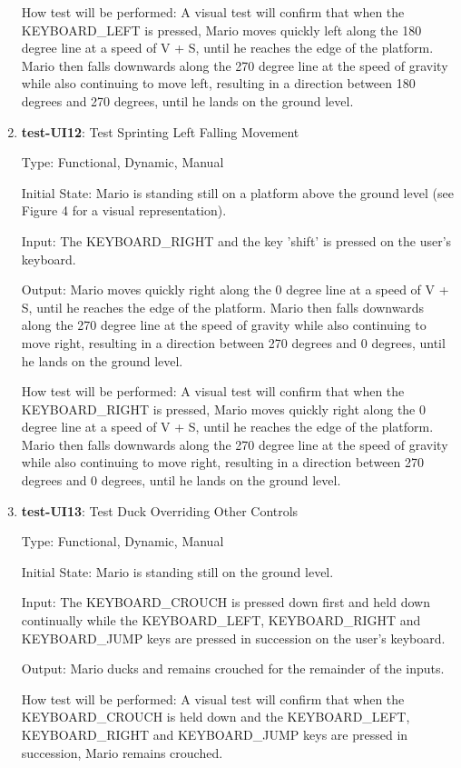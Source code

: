 \documentclass[12pt, titlepage]{article}
\begin{document}
\begin{enumerate}
How test will be performed: A visual test will confirm that when the KEYBOARD\_LEFT is pressed, Mario moves quickly left along the 180 degree line at a speed of V + S, until he reaches the edge of the platform. Mario then falls downwards along the 270 degree line at the speed of gravity while also continuing to move left, resulting in a direction between 180 degrees and 270 degrees, until he lands on the ground level.

\item{\textbf{test-UI12}: Test Sprinting Left Falling Movement\\}

Type: Functional, Dynamic, Manual
					
Initial State: Mario is standing still on a platform above the ground level (see Figure 4 for a visual representation).
					
Input: The KEYBOARD\_RIGHT and the key 'shift' is pressed on the user's keyboard.
					
Output: Mario moves quickly right along the 0 degree line at a speed of V + S, until he reaches the edge of the platform. Mario then falls downwards along the 270 degree line at the speed of gravity while also continuing to move right, resulting in a direction between 270 degrees and 0 degrees, until he lands on the ground level.
					
How test will be performed: A visual test will confirm that when the KEYBOARD\_RIGHT is pressed, Mario moves quickly right along the 0 degree line at a speed of V + S, until he reaches the edge of the platform. Mario then falls downwards along the 270 degree line at the speed of gravity while also continuing to move right, resulting in a direction between 270 degrees and 0 degrees, until he lands on the ground level.

\item{\textbf{test-UI13}: Test Duck Overriding Other Controls\\}

Type: Functional, Dynamic, Manual
					
Initial State: Mario is standing still on the ground level.
					
Input: The KEYBOARD\_CROUCH is pressed down first and held down continually while the KEYBOARD\_LEFT, KEYBOARD\_RIGHT and KEYBOARD\_JUMP keys are pressed in succession on the user's keyboard.
					
Output: Mario ducks and remains crouched for the remainder of the inputs.
					
How test will be performed: A visual test will confirm that when the KEYBOARD\_CROUCH is held down and the KEYBOARD\_LEFT, KEYBOARD\_RIGHT and KEYBOARD\_JUMP keys are pressed in succession, Mario remains crouched.


\end{enumerate}
\end{document}

